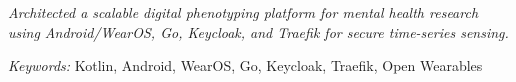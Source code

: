 
\noindent
\textit{Architected a scalable digital phenotyping platform for mental health research using Android/WearOS, Go, Keycloak, and Traefik for secure time-series sensing.}

\noindent
\textit{Keywords:} Kotlin, Android, WearOS, Go, Keycloak, Traefik, Open Wearables
